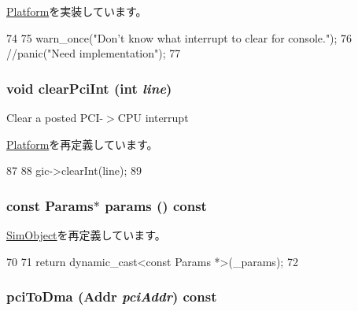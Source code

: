 \hyperlink{classPlatform_aaf1bfcf0f5ac95c6a9d1607172a5a29e}{Platform}を実装しています。


\begin{DoxyCode}
74 {
75     warn_once("Don't know what interrupt to clear for console.\n");
76     //panic("Need implementation\n");
77 }
\end{DoxyCode}
\hypertarget{classRealView_a0d98ea2b236bb883fa15d63a59a2ec9e}{
\subsubsection[{clearPciInt}]{\setlength{\rightskip}{0pt plus 5cm}void clearPciInt (int {\em line})}}
\label{classRealView_a0d98ea2b236bb883fa15d63a59a2ec9e}
Clear a posted PCI-\/$>$CPU interrupt 

\hyperlink{classPlatform_a0d98ea2b236bb883fa15d63a59a2ec9e}{Platform}を再定義しています。


\begin{DoxyCode}
87 {
88     gic->clearInt(line);
89 }
\end{DoxyCode}
\hypertarget{classRealView_acd3c3feb78ae7a8f88fe0f110a718dff}{
\subsubsection[{params}]{\setlength{\rightskip}{0pt plus 5cm}const {\bf Params}$\ast$ params () const}}
\label{classRealView_acd3c3feb78ae7a8f88fe0f110a718dff}


\hyperlink{classSimObject_acd3c3feb78ae7a8f88fe0f110a718dff}{SimObject}を再定義しています。


\begin{DoxyCode}
70                    {
71         return dynamic_cast<const Params *>(_params);
72     }
\end{DoxyCode}
\hypertarget{classRealView_a87078b3d3a28ae134f6736337e90dac3}{
\subsubsection[{pciToDma}]{ pciToDma ({\bf Addr} {\em pciAddr}) const}}
\label{classRealView_a87078b3d3a28ae134f6736337e90dac3}


